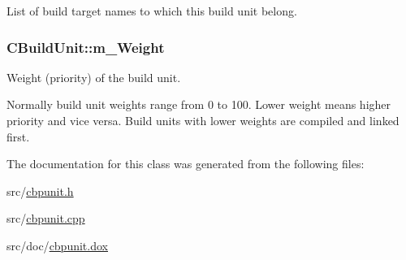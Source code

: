 List of build target names to which this build unit belong. 

\hypertarget{classCBuildUnit_aae6c75ed4d916241e1daf249425b5dc5}{
\subsubsection[{m\-\_\-\-Weight}]{\setlength{\rightskip}{0pt plus 5cm}C\-Build\-Unit\-::m\-\_\-\-Weight\hspace{0.3cm}{\ttfamily [private]}}}\label{classCBuildUnit_aae6c75ed4d916241e1daf249425b5dc5}


Weight (priority) of the build unit. 

Normally build unit weights range from 0 to 100. Lower weight means higher priority and vice versa. Build units with lower weights are compiled and linked first. 

The documentation for this class was generated from the following files\-:\begin{DoxyCompactItemize}
\item 
src/\hyperlink{cbpunit_8h}{cbpunit.\-h}\item 
src/\hyperlink{cbpunit_8cpp}{cbpunit.\-cpp}\item 
src/doc/\hyperlink{cbpunit_8dox}{cbpunit.\-dox}\end{DoxyCompactItemize}
